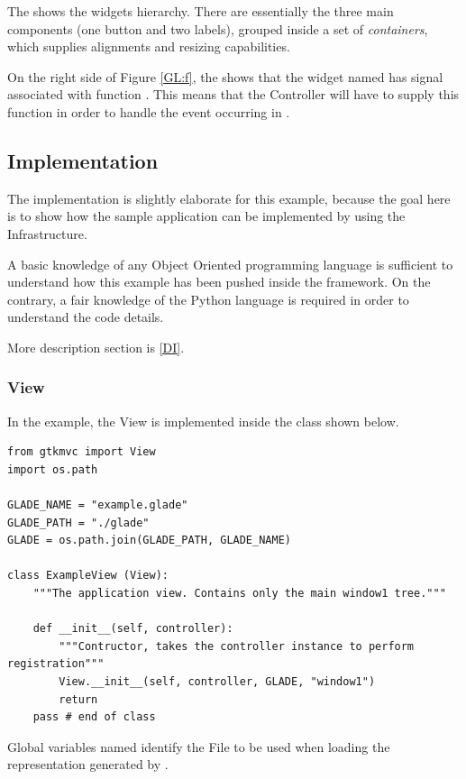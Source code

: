 The  shows the widgets hierarchy. There are
essentially the three main components (one button and two labels),
grouped inside a set of \emph{containers}, which supplies alignments and
resizing capabilities.

On the right side of Figure \ref{GL:f}, the 
shows that the widget named  has signal
 associated with function
. This means that the Controller will
have to supply this function in order to handle the 
event occurring in .

\subsection{Implementation}
The implementation is slightly elaborate for this example, because the
goal here is to show how the sample application can be implemented by
using the \mvco Infrastructure.

A basic knowledge of any Object Oriented programming language is
sufficient to understand how this example has been pushed inside the
\mvco framework. On the contrary, a fair knowledge of the Python
language is required in order to understand the code details.

More description section is \ref{DI}.


\subsubsection{View}
In the example, the View is implemented inside the class
 shown below.

{ \codesize 
\begin{verbatim}  
from gtkmvc import View
import os.path

GLADE_NAME = "example.glade"
GLADE_PATH = "./glade" 
GLADE = os.path.join(GLADE_PATH, GLADE_NAME)

class ExampleView (View):
    """The application view. Contains only the main window1 tree."""

    def __init__(self, controller):
        """Contructor, takes the controller instance to perform registration"""
        View.__init__(self, controller, GLADE, "window1")
        return
    pass # end of class
\end{verbatim}}

Global variables named  identify the \glade File to
be used when loading the \gui representation generated by \glade.

